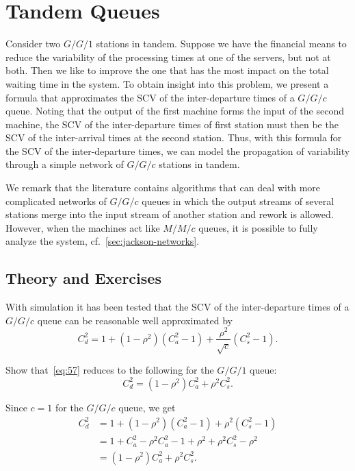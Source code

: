 \section{Tandem Queues}
\label{sec:tandem-queues}


Consider two $G/G/1$ stations in tandem.
Suppose we have the financial means to reduce the variability of the processing times at one of the servers, but not at both.
Then we like to improve the one that has the most impact on the total waiting time in the system.
To obtain insight into this problem, we present a formula that approximates the SCV of the inter-departure times of a $G/G/c$ queue.
Noting that the output of the first machine forms the input of the second machine, the SCV of the inter-departure times of first station must then be the SCV of the inter-arrival times at the second station.
Thus, with this formula for the SCV of the inter-departure times, we can model the propagation of variability through a simple network of $G/G/c$ stations in tandem.

We remark that the literature contains algorithms that can deal with more complicated networks of $G/G/c$ queues in which the output streams of several stations merge into the input stream of another station and rework is allowed.
However, when the machines act like $M/M/c$ queues, it is possible to fully analyze the system, cf.~\cref{sec:jackson-networks}.

\subsection*{Theory and Exercises}


With simulation it has been tested that the SCV of the inter-departure times of a $G/G/c$ queue can be reasonable well approximated by
\begin{equation}\label{eq:57}
 C_{d}^2 = 1 + (1-\rho^2)(C_{a}^2-1) + \frac{\rho^2}{\sqrt{c}}(C_{s}^2-1).
\end{equation}


\begin{exercise}
 Show that~\cref{eq:57}  reduces to the following for the $G/G/1$ queue: 
\begin{equation}
 \label{eq:40}
 C_{d}^2 =  (1-\rho^2) C_{a}^2 + \rho^2 C_{s}^2.
\end{equation}
\begin{solution}
 Since $c=1$ for the $G/G/c$ queue, we get
\begin{align*}
 C_{d}^2 
&= 1 + (1-\rho^2)(C_{a}^2-1) + \rho^2(C_{s}^2-1) \\
&= 1 + C_a^2 - \rho^2 C_{a}^2 -1 + \rho^2 + \rho^2 C_{s}^2 -\rho^2 \\
&= (1-\rho^2) C_a^2 + \rho^2 C_{s}^2.
\end{align*}
\end{solution}
\end{exercise}

